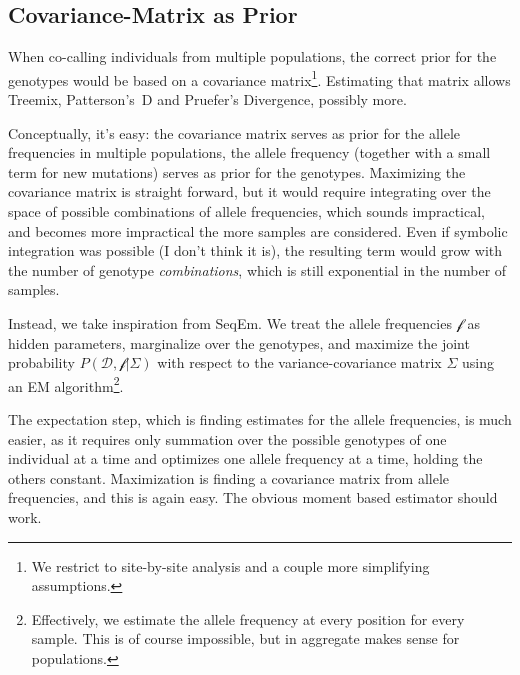 \documentclass{article}
\begin{document}
\subsection{Covariance-Matrix as Prior}

When co-calling individuals from multiple populations, the correct prior
for the genotypes would be based on a covariance matrix\footnote{We
restrict to site-by-site analysis and a couple more simplifying
assumptions.}.  Estimating
that matrix allows Treemix, Patterson's~D and Pruefer's Divergence,
possibly more.  %

Conceptually, it's easy:  the covariance matrix serves as prior for the
allele frequencies in multiple populations, the allele frequency
(together with a small term for new mutations) serves as prior for the
genotypes.  Maximizing the covariance matrix is
straight forward, but it would require integrating over the space of
possible combinations of allele frequencies, which sounds impractical,
and becomes more impractical the more samples are considered.  Even if
symbolic integration was possible (I don't think it is), the resulting
term would grow with the number of genotype \emph{combinations}, which
is still exponential in the number of samples.

Instead, we take inspiration from SeqEm\cite{seqem}.  We treat the
allele frequencies $\mathcal{f}$ as hidden parameters, marginalize over
the genotypes, and maximize the joint probability $P(\mathcal{D},
\mathcal{f} | \Sigma)$ with respect to the variance-covariance matrix
$\Sigma$ using an EM algorithm\footnote{Effectively, we estimate the
allele frequency at every position for every sample.  This is of course
impossible, but in aggregate makes sense for populations.}.

The expectation step, which is finding estimates for the allele
frequencies, is much easier, as it requires only summation over the
possible genotypes of one individual at a time and optimizes one allele
frequency at a time, holding the others constant.  Maximization is
finding a covariance matrix from allele frequencies, and this is again
easy.  The obvious moment based estimator should work.

\end{document}
